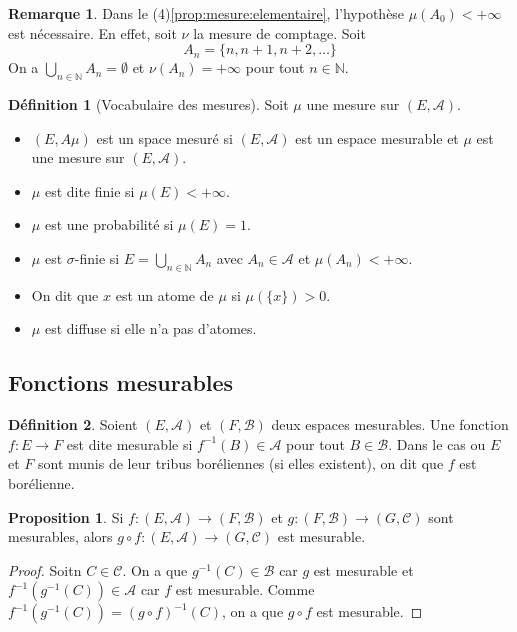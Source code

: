\documentclass{article}
\theoremstyle{definition}
\newtheorem{definition}{Définition}
\theoremstyle{definition}
\newtheorem{prop}{Proposition}
\theoremstyle{definition}
\theoremstyle{definition}
\theoremstyle{plain}
\theoremstyle{definition}
\newtheorem{remarque}{Remarque}
\begin{document}
\begin{remarque}
	Dans le (4)\ref{prop:mesure:elementaire}, l'hypothèse $\mu(A_0) < +\infty$ est nécessaire. En effet, soit
	$\nu$ la mesure de comptage. Soit
	\[ A_n = \{ n, n+1, n+2, \dots \} \]
	On a $\bigcup\limits_{n \in \mathbb{N}} A_n = \emptyset$ et $\nu(A_n) = +\infty$ pour tout $n \in \mathbb{N}$.
\end{remarque}

\begin{definition}[Vocabulaire des mesures]
	Soit $\mu$ une mesure sur $(E, \mathscr{A})$.
	\begin{itemize}
		\item $(E,A\mu)$ est un space mesuré si $(E,\mathscr{A})$ est un espace mesurable et $\mu$ est une mesure sur $ (E, \mathscr{A} ) $.
		\item $\mu$ est dite finie si $\mu(E) < +\infty$.
		\item $\mu$ est une probabilité si $\mu(E) = 1$.
		\item $\mu$ est $\sigma$-finie si $E = \bigcup\limits_{n \in \mathbb{N}} A_n$ avec $A_n \in \mathscr{A}$ et $\mu(A_n) < +\infty$.
		\item On dit que $x$ est un atome de $\mu$ si $\mu(\{x\}) > 0$.
		\item $\mu$ est diffuse si elle n'a pas d'atomes.
	\end{itemize}
\end{definition}

\subsection{Fonctions mesurables}

\begin{definition}
	Soient $(E, \mathscr{A})$ et $(F, \mathscr{B})$ deux espaces mesurables. Une fonction $f: E \to F$ est dite mesurable si
	$f^{-1}(B) \in \mathscr{A}$ pour tout $B \in \mathscr{B}$.
	Dans le cas ou $E$ et $F$ sont munis de leur tribus boréliennes (si elles existent), on dit que $f$ est borélienne.
\end{definition}


\begin{prop}
	Si $f: (E, \mathscr{A}) \to (F, \mathscr{B})$ et $g: (F, \mathscr{B}) \to (G, \mathscr{C})$
	sont mesurables, alors $g \circ f : (E, \mathscr{A}) \to (G, \mathscr{C})$ est mesurable.
\end{prop}

\begin{proof}
	Soitn $C \in \mathscr{C}$. On a que $g^{-1}(C) \in \mathscr{B}$ car $g$ est mesurable et
	$f^{-1}(g^{-1}(C)) \in \mathscr{A}$ car $f$ est mesurable.
	Comme $f^{-1}(g^{-1}(C)) = (g \circ f)^{-1}(C)$, on a que $g \circ f$ est mesurable.
\end{proof}
\end{document}
